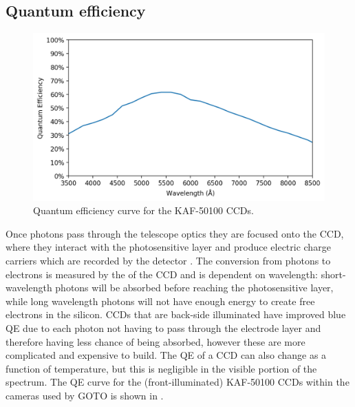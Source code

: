 
\subsection{Quantum efficiency}
\label{sec:qe}
\begin{colsection}

\begin{figure}[t]
    \begin{center}
        \includegraphics[width=\linewidth]{images/throughput/qe.png}
    \end{center}
    \caption[CCD quantum efficiency curve]{
        Quantum efficiency curve for the KAF-50100 CCDs.
    }\label{fig:qe}
\end{figure}

Once photons pass through the telescope optics they are focused onto the CCD, where they interact with the photosensitive layer and produce electric charge carriers which are recorded by the detector \citep{CCDs}. The conversion from photons to electrons is measured by the  of the CCD and is dependent on wavelength: short-wavelength photons will be absorbed before reaching the photosensitive layer, while long wavelength photons will not have enough energy to create free electrons in the silicon. CCDs that are back-side illuminated have improved blue QE due to each photon not having to pass through the electrode layer and therefore having less chance of being absorbed, however these are more complicated and expensive to build. The QE of a CCD can also change as a function of temperature, but this is negligible in the visible portion of the spectrum. The QE curve for the (front-illuminated) KAF-50100 CCDs within the cameras used by GOTO is shown in .

\newpage

\end{colsection}

